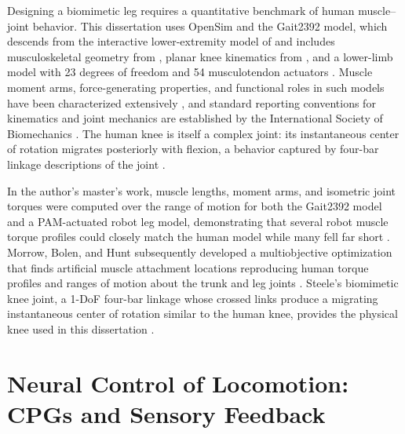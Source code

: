Designing a biomimetic leg requires a quantitative benchmark of human muscle--joint behavior. This dissertation uses OpenSim \citep{delp_opensim_2007, seth_opensim_2011, seth_opensim_2018} and the Gait2392 model, which descends from the interactive lower-extremity model of \citet{delp_interactive_1990} and includes musculoskeletal geometry from \citet{hoy_musculoskeletal_1990}, planar knee kinematics from \citet{yamaguchi_planar_1989}, and a lower-limb model with 23 degrees of freedom and 54 musculotendon actuators \citep{arnold_model_2010}. Muscle moment arms, force-generating properties, and functional roles in such models have been characterized extensively \citep{zajac_determining_1989, brand_model_1982, menegaldo_moment_2004, millard_flexing_2013, sherman_what_2013, suderman_moving_2012}, and standard reporting conventions for kinematics and joint mechanics are established by the International Society of Biomechanics \citep{wu_for_1995, wu_isb_2002, wu_isb_2005, derrick_isb_2020}. The human knee is itself a complex joint: its instantaneous center of rotation migrates posteriorly with flexion, a behavior captured by four-bar linkage descriptions of the joint \citep{romero_four-bar_2020, steele_biomimetic_2018}.

In the author's master's work, muscle lengths, moment arms, and isometric joint torques were computed over the range of motion for both the Gait2392 model and a PAM-actuated robot leg model, demonstrating that several robot muscle torque profiles could closely match the human model while many fell far short \citep{bolen_bipedal_2019, bolen_determination_2019}. Morrow, Bolen, and Hunt subsequently developed a multiobjective optimization that finds artificial muscle attachment locations reproducing human torque profiles and ranges of motion about the trunk and leg joints \citep{morrow_optimization_2020}. Steele's biomimetic knee joint, a 1-DoF four-bar linkage whose crossed links produce a migrating instantaneous center of rotation similar to the human knee, provides the physical knee used in this dissertation \citep{steele_development_2017, steele_biomimetic_2018, steele_biomimetic_2018-1}.

\section{Neural Control of Locomotion: CPGs and Sensory Feedback}\label{sec:bg_neural}

